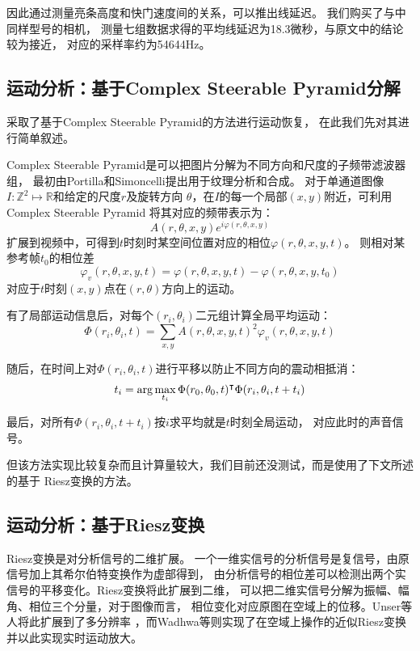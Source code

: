因此通过测量亮条高度和快门速度间的关系，可以推出线延迟。
我们购买了与\cite{Davis2014VisualMic}中同样型号的相机，
测量七组数据求得的平均线延迟为18.3微秒，与原文中的结论较为接近，
对应的采样率约为54644Hz。

\subsection{运动分析：基于Complex Steerable Pyramid分解}
\cite{Davis2014VisualMic}采取了基于Complex Steerable Pyramid的方法进行运动恢复，
在此我们先对其进行简单叙述。

Complex Steerable Pyramid是可以把图片分解为不同方向和尺度的子频带滤波器组，
最初由Portilla和Simoncelli提出用于纹理分析和合成\cite{Portilla99}。
对于单通道图像$I: \mathbb{Z}^2 \mapsto \mathbb{R}$和给定的尺度$r$及旋转方向
$\theta$，在$I$的每一个局部$(x, y)$附近，可利用Complex Steerable Pyramid
将其对应的频带表示为：
\begin{equation}
    A(r, \theta, x, y) e^{i\varphi(r, \theta, x, y)}
\end{equation}
扩展到视频中，可得到$t$时刻时某空间位置对应的相位$\varphi(r, \theta, x, y, t)$。
则相对某参考帧$t_0$的相位差
\begin{equation}
    \varphi_v(r, \theta, x, y, t) = \varphi(r, \theta, x, y, t) - 
    \varphi(r, \theta, x, y, t_0)
\end{equation}
对应于$t$时刻$(x, y)$点在$(r, \theta)$方向上的运动。

有了局部运动信息后，对每个$(r_i, \theta_i)$二元组计算全局平均运动：
\begin{equation}
    \Phi(r_i, \theta_i, t) = \sum_{x, y}
    A(r, \theta, x, y, t)^2 \varphi_v(r, \theta, x, y, t)
\end{equation}

随后，在时间上对$\Phi(r_i, \theta_i, t)$进行平移以防止不同方向的震动相抵消：
\begin{equation}
    t_i = \arg\max_{t_i} \Phi(r_0, \theta_0, t)^\intercal\Phi(r_i, \theta_i, t +
    t_i)
\end{equation}

最后，对所有$\Phi(r_i, \theta_i, t + t_i)$按$i$求平均就是$t$时刻全局运动，
对应此时的声音信号。

但该方法实现比较复杂而且计算量较大，我们目前还没测试，而是使用了下文所述的基于
Riesz变换的方法。


\subsection{运动分析：基于Riesz变换}
Riesz变换\cite{felsberg2001monogenic}是对分析信号的二维扩展。
一个一维实信号的分析信号是复信号，由原信号加上其希尔伯特变换作为虚部得到，
由分析信号的相位差可以检测出两个实信号的平移变化。Riesz变换将此扩展到二维，
可以把二维实信号分解为振幅、幅角、相位三个分量，对于图像而言，
相位变化对应原图在空域上的位移。Unser等人将此扩展到了多分辨率
\cite{unser2009multiresolution}，而Wadhwa等则实现了在空域上操作的近似Riesz变换
并以此实现实时运动放大\cite{Wadhwa2014RieszPyramid}。

